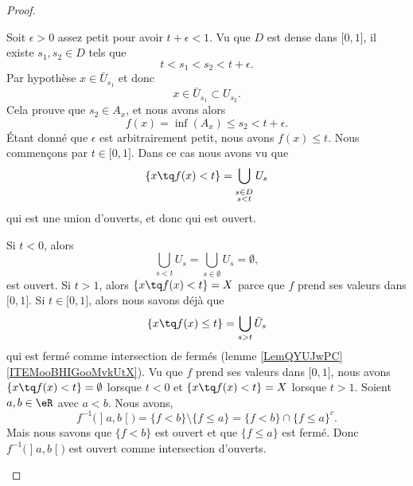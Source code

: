 \begin{proof}
\begin{subproof}
			Soit \( \epsilon>0\) assez petit pour avoir \( t+\epsilon<1\). Vu que \( D\) est dense dans \( \mathopen[ 0 , 1 \mathclose]\), il existe \( s_1,s_2\in D\) tels que
			\begin{equation}
				t<s_1<s_2<t+\epsilon.
			\end{equation}
			Par hypothèse \( x\in \bar U_{s_1}\) et donc
			\begin{equation}
				x\in \bar U_{s_1}\subset U_{s_2}.
			\end{equation}
			Cela prouve que \( s_2\in A_x\), et nous avons alors
			\begin{equation}
				f(x)=\inf(A_x)\leq s_2<t+\epsilon.
			\end{equation}
			Étant donné que \( \epsilon\) est arbitrairement petit, nous avons \( f(x)\leq t\).
			Nous commençons par \( t\in \mathopen[ 0 , 1 \mathclose]\). Dans ce cas nous avons vu que
			\begin{equation}
				\{ x\tq f(x)<t \}=\bigcup_{_{\substack{s\in D\\s<t}}}U_s
			\end{equation}
			qui est une union d'ouverts, et donc qui est ouvert.

			Si \( t<0\), alors
			\begin{equation}
				\bigcup_{s<t}U_s=\bigcup_{s\in\emptyset}U_s=\emptyset,
			\end{equation}
			est ouvert. Si \( t>1\), alors \( \{ x\tq f(x)<t \}=X\) parce que \( f\) prend ses valeurs dans \( \mathopen[ 0 , 1 \mathclose]\).
			Si \( t\in\mathopen[ 0 , 1 \mathclose]\), alors nous savons déjà que
			\begin{equation}
				\{ x\tq f(x)\leq t \}=\bigcup_{s>t}\bar U_s
			\end{equation}
			qui est fermé comme intersection de fermés (lemme \ref{LemQYUJwPC}\ref{ITEMooBHIGooMvkUtX}). Vu que \( f\) prend ses valeurs dans \( \mathopen[ 0 , 1 \mathclose]\), nous avons \( \{ x\tq f(x)<t \}=\emptyset\) lorsque \( t<0\) et \( \{ x\tq f(x)<t \}=X\) lorsque \( t>1\).
			Soient \( a,b\in \eR\) avec \( a<b\). Nous avons,
			\begin{equation}
				f^{-1}\big( \mathopen] a , b \mathclose[ \big)=\{ f<b \}\setminus\{ f\leq a \}=\{ f<b \}\cap \{ f\leq a \}^c.
			\end{equation}
			Mais nous savons que \( \{ f<b \}\) est ouvert et que \( \{ f\leq a \}\) est fermé. Donc \( f^{-1}\big( \mathopen] a , b \mathclose[ \big)\) est ouvert comme intersection d'ouverts.


\end{subproof}
\end{proof}
